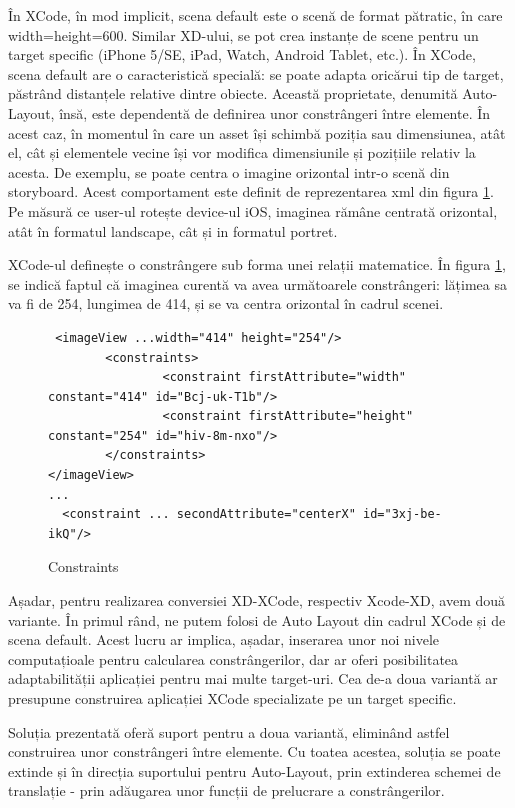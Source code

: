 În XCode, în mod implicit, scena default este o scenă de format pătratic, în care width=height=600. Similar XD-ului, se pot crea instanțe de scene pentru un target specific (iPhone 5/SE, iPad, Watch, Android Tablet, etc.). În XCode, scena default are o caracteristică specială: se poate adapta oricărui tip de target, păstrând distanțele relative dintre obiecte. Această proprietate, denumită Auto-Layout, însă, este dependentă de definirea unor constrângeri între elemente. În acest caz, în momentul în care un asset își schimbă poziția sau dimensiunea, atât el, cât și elementele vecine își vor modifica dimensiunile și pozițiile relativ la acesta. De exemplu, se poate centra o imagine orizontal intr-o scenă din storyboard. Acest comportament este definit de reprezentarea xml din figura \ref{fig:Constraints}. Pe măsură ce user-ul rotește device-ul iOS, imaginea rămâne centrată orizontal, atât în formatul landscape, cât și in formatul portret.

XCode-ul definește o constrângere sub forma unei relații matematice. În figura \ref{fig:Constraints}, se indică faptul că imaginea curentă va avea următoarele constrângeri: lățimea sa va fi de 254, lungimea de 414, și se va centra orizontal în cadrul scenei.  

\begin{figure}[!htbp]
\lstset{language=XML}
\begin{lstlisting}
 <imageView ...width="414" height="254"/>
        <constraints>
                <constraint firstAttribute="width" constant="414" id="Bcj-uk-T1b"/>
                <constraint firstAttribute="height" constant="254" id="hiv-8m-nxo"/>
        </constraints>
</imageView>
...
  <constraint ... secondAttribute="centerX" id="3xj-be-ikQ"/>
\end{lstlisting}
\caption{Constraints} \label{fig:Constraints}
\end{figure}

Așadar, pentru realizarea conversiei XD-XCode, respectiv Xcode-XD, avem două variante. În primul rând, ne putem folosi de Auto Layout din cadrul XCode și de scena default. Acest lucru ar implica, așadar, inserarea unor noi nivele computațioale pentru calcularea constrângerilor, dar ar oferi posibilitatea adaptabilității aplicației pentru mai multe target-uri.
Cea de-a doua variantă ar presupune construirea aplicației XCode specializate pe un target specific. 

Soluția prezentată oferă suport pentru a doua variantă, eliminând astfel construirea unor constrângeri între elemente. Cu toatea acestea, soluția se poate extinde și în direcția suportului pentru Auto-Layout, prin extinderea schemei de translație - prin adăugarea unor funcții de prelucrare a constrângerilor.

